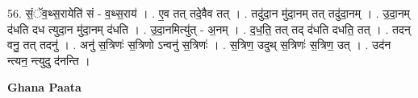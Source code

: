 \documentclass[17pt]{extarticle}
\begin{document}
56. सं॒ॅव॒थ्स॒रायेति॑ सं - व॒थ्स॒राय॑ । . ए॒व तत् तदे॒वैव तत् । . तदु॑दा॒न मु॑दा॒नम् तत् तदु॑दा॒नम् । . उ॒दा॒नम् द॑धति दध त्युदा॒न मु॑दा॒नम् द॑धति । . उ॒दा॒नमित्यु॑त् - अ॒नम् । . द॒ध॒ति॒ तत् तद् द॑धति दधति॒ तत् । . तदन् वनु॒ तत् तदनु॑ । . अनु॑ स॒त्रिणः॑ स॒त्रिणो ऽन्वनु॑ स॒त्रिणः॑ । . स॒त्रिण॒ उदुथ् स॒त्रिणः॑ स॒त्रिण॒ उत् । . उद॑न न्त्यन॒ न्त्युदु द॑नन्ति । \newline

\textbf{Ghana Paata } \newline
\end{document}
